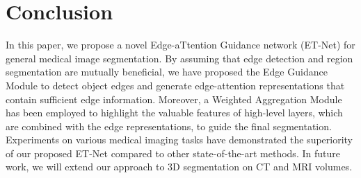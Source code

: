 \documentclass[runningheads,a4paper]{llncs}
\begin{document}
\section{Conclusion}
\label{sec:conclusion}


In this paper, we propose a novel Edge-aTtention Guidance network (ET-Net) for general medical image segmentation. By assuming that edge detection and region segmentation are mutually beneficial, we have proposed the Edge Guidance Module to detect object edges and generate edge-attention representations that contain sufficient edge information. Moreover, a Weighted Aggregation Module has been employed to highlight the valuable features of high-level layers, which are combined with the edge representations, to guide the final segmentation. Experiments on various medical imaging tasks have demonstrated the superiority of our proposed ET-Net compared to other state-of-the-art methods. In future work, we will extend our approach to 3D segmentation on CT and MRI volumes.



\end{document}
